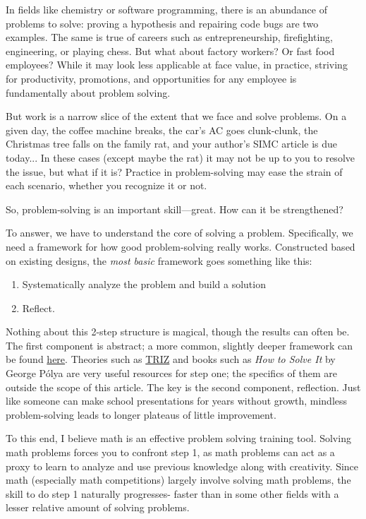\documentclass{article}
\begin{document}
\begin{multicols}{3}
In fields like chemistry or software programming, there is an abundance of problems to solve: proving a hypothesis and repairing code bugs are two examples. The same is true of careers such as entrepreneurship, firefighting, engineering, or playing chess. But what about factory workers? Or fast food employees? While it may look less applicable at face value, in practice, striving for productivity, promotions, and opportunities for any employee is fundamentally about problem solving. 

But work is a narrow slice of the extent that we face and solve problems. On a given day, the coffee machine breaks, the car’s AC goes clunk-clunk, the Christmas tree falls on the family rat, and your author’s SIMC article is due today... In these cases (except maybe the rat) it may not be up to you to resolve the issue, but what if it is? Practice in problem-solving may ease the strain of each scenario, whether you recognize it or not.

So, problem-solving is an important skill—great. How can it be strengthened?

To answer, we have to understand the core of solving a problem. Specifically, we need a framework for how good problem-solving really works. Constructed based on existing designs, the \textit{most basic} framework goes something like this:
\begin{enumerate}
    \item Systematically analyze the problem and build a solution
    \item Reflect.
\end{enumerate}

Nothing about this 2-step structure is magical, though the results can often be. The first component is abstract; a more common, slightly deeper framework can be found \href{https://asq.org/quality-resources/problem-solving}{here}. Theories such as \href{https://en.wikipedia.org/wiki/TRIZ}{TRIZ} and books such as \textit{How to Solve It} by George Pólya are very useful resources for step one; the specifics of them are outside the scope of this article. The key is the second component, reflection. Just like someone can make school presentations for years without growth, mindless problem-solving leads to longer plateaus of little improvement.

To this end, I believe math is an effective problem solving training tool. Solving math problems forces you to confront step 1, as math problems can act as a proxy to learn to analyze and use previous knowledge along with creativity. Since math (especially math competitions) largely involve solving math problems, the skill to do step 1 naturally progresses- faster than in some other fields with a lesser relative amount of solving problems.


\end{multicols}
\end{document}
